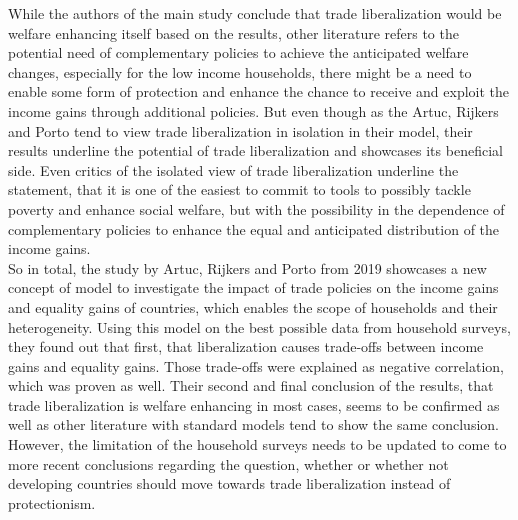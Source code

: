 While the authors of the main study conclude that trade liberalization would be welfare enhancing itself based on the results,
other literature refers to the potential need of complementary policies to achieve the anticipated welfare changes, especially
for the low income households, there might be a need to enable some form of protection and enhance the chance to receive and
exploit the income gains through additional policies. But even though as the Artuc, Rijkers and Porto tend to view trade 
liberalization in isolation in their model, their results underline the potential of trade liberalization and showcases its 
beneficial side. Even critics of the isolated view of trade liberalization underline the statement, that it is one of the
easiest to commit to tools to possibly tackle poverty and enhance social welfare, but with the possibility in the dependence
of complementary policies to enhance the equal and anticipated distribution of the income gains. \\

So in total, the study by Artuc, Rijkers and Porto from 2019 showcases a new concept of model to investigate the impact of
trade policies on the income gains and equality gains of countries, which enables the scope of households and their heterogeneity.
Using this model on the best possible data from household surveys, they found out that first, that liberalization causes
trade-offs between income gains and equality gains. Those trade-offs were explained as negative correlation, which was proven
as well. Their second and final conclusion of the results, that trade liberalization is welfare enhancing in most cases, seems
to be confirmed as well as other literature with standard models tend to show the same conclusion. However, the limitation of
the household surveys needs to be updated to come to more recent conclusions regarding the question, whether or whether not
developing countries should move towards trade liberalization instead of protectionism. 






